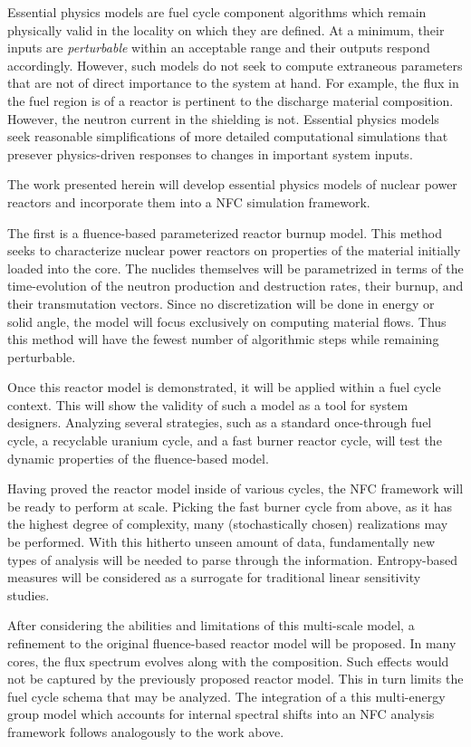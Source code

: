Essential physics models are fuel cycle component algorithms which remain physically valid in the 
locality on which they are defined.  At a minimum, their inputs are \emph{perturbable} 
within an acceptable range and their outputs respond accordingly.  However, such 
models do not seek to compute extraneous parameters that are not of direct importance
to the system at hand.  For example, the flux in the fuel region is of a reactor is 
pertinent to the discharge material composition.  However, the neutron current in the 
shielding is not. 
Essential physics models seek reasonable simplifications of more detailed computational 
simulations that presever physics-driven responses to changes in important system 
inputs.

The work presented herein will develop essential physics models of nuclear power reactors
and incorporate them into a NFC simulation framework.

The first is a fluence-based parameterized reactor burnup model.  
This method seeks to characterize nuclear power
reactors on properties of the material initially loaded into the core.  The nuclides
themselves will be parametrized in terms of the time-evolution of the neutron production 
and destruction rates, their burnup, and their transmutation vectors.  Since no discretization
will be done in energy or solid angle, the model will focus exclusively on computing 
material flows.  Thus this method will have the fewest number of algorithmic steps while 
remaining perturbable. 

Once this reactor model is demonstrated, it will be applied within a fuel
cycle context.  This will show the validity of such a model as a tool for system designers.
Analyzing several strategies, such as a standard once-through fuel cycle, a recyclable uranium
cycle, and a fast burner reactor cycle, will test the dynamic properties of the fluence-based
model.  

Having proved the reactor model inside of various cycles, the NFC framework will be ready to 
perform at scale.  Picking the fast burner cycle from above, as it has the highest degree of complexity, 
many (stochastically chosen) realizations may be performed.  With this hitherto unseen amount of data, 
fundamentally new types of analysis will be needed to parse through the information.  Entropy-based measures
will be considered as a surrogate for traditional linear sensitivity studies.

After considering the abilities and limitations of this multi-scale model, a refinement to 
the original fluence-based reactor model will be proposed.  In many cores, the flux spectrum
evolves along with the composition.  Such effects would not be captured by the previously 
proposed reactor model.  This in turn limits the fuel cycle schema that may be analyzed.
The integration of a this multi-energy group model which 
accounts for internal spectral shifts into an NFC analysis framework follows
analogously to the work above.

